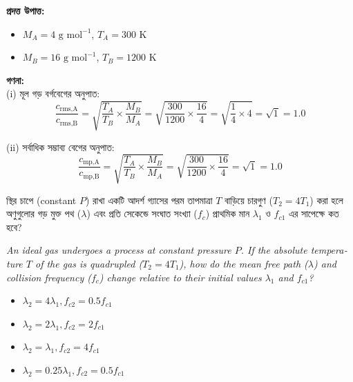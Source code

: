 \documentclass[12pt, a4paper]{article}
\begin{document}
\begin{tcolorbox}[solutionbox={সমাধান (Solution)}]
    \noindent
    \textbf{প্রদত্ত উপাত্ত:}
    \begin{itemize}[leftmargin=1.5em, itemsep=0.2em]
        \item $M_A = 4\text{ g mol}^{-1}$, $T_A = 300\text{ K}$
        \item $M_B = 16\text{ g mol}^{-1}$, $T_B = 1200\text{ K}$
    \end{itemize}

    \vspace{0.6em}
    \noindent\textbf{গণনা:} \\
    (i) মূল গড় বর্গবেগের অনুপাত:
    \[ \frac{c_{\text{rms,A}}}{c_{\text{rms,B}}} = \sqrt{\frac{T_A}{T_B} \times \frac{M_B}{M_A}} = \sqrt{\frac{300}{1200} \times \frac{16}{4}} = \sqrt{\frac{1}{4} \times 4} = \sqrt{1} = \mathbf{1.0} \]
    
    (ii) সর্বাধিক সম্ভাব্য বেগের অনুপাত:
    \[ \frac{c_{\text{mp,A}}}{c_{\text{mp,B}}} = \sqrt{\frac{T_A}{T_B} \times \frac{M_B}{M_A}} = \sqrt{\frac{300}{1200} \times \frac{16}{4}} = \sqrt{1} = \mathbf{1.0} \]
\end{tcolorbox}


\begin{tcolorbox}[questionbox={প্রশ্ন (Question) 7}]
    \noindent
    স্থির চাপে (constant $P$) রাখা একটি আদর্শ গ্যাসের পরম তাপমাত্রা $T$ বাড়িয়ে চারগুণ ($T_2 = 4T_1$) করা হলে অণুগুলোর গড় মুক্ত পথ ($\lambda$) এবং প্রতি সেকেন্ডে সংঘাত সংখ্যা ($f_c$) প্রাথমিক মান $\lambda_1$ ও $f_{c1}$ এর সাপেক্ষে কত হবে?
    
    \vspace{0.8em}
    \begin{english}
    \noindent\textit{\color{darkgray}
    An ideal gas undergoes a process at constant pressure $P$. If the absolute temperature $T$ of the gas is quadrupled ($T_2 = 4T_1$), how do the mean free path ($\lambda$) and collision frequency ($f_c$) change relative to their initial values $\lambda_1$ and $f_{c1}$?
    }
    \end{english}
\end{tcolorbox}

\begin{itemize}[label={}, leftmargin=1cm, itemsep=0.5em]
    \item[\textbf{A)}] $\lambda_2 = 4 \lambda_1, f_{c2} = 0.5 f_{c1}$
    \item[\textbf{B)}] $\lambda_2 = 2 \lambda_1, f_{c2} = 2 f_{c1}$
    \item[\textbf{C)}] $\lambda_2 = \lambda_1, f_{c2} = 4 f_{c1}$
    \item[\textbf{D)}] $\lambda_2 = 0.25 \lambda_1, f_{c2} = 0.5 f_{c1}$
\end{itemize}
\end{document}
